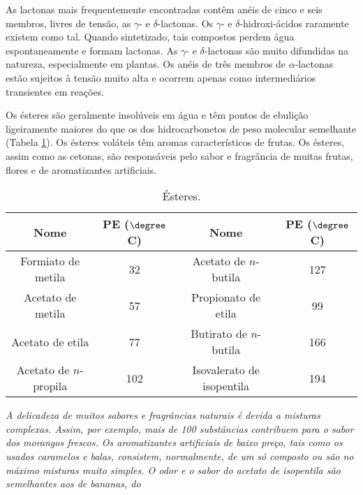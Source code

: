 \noindent As lactonas mais frequentemente encontradas contêm anéis de cinco e seis membros, livres de tensão, as $\gamma$- e $\delta$-lactonas. Os $\gamma$- e $\delta$-hidroxi-ácidos raramente existem como tal. Quando sintetizado, tais compostos perdem água espontaneamente e formam lactonas. As $\gamma$- e $\delta$-lactonas são muito difundidas na natureza, especialmente em plantas. Os anéis de três membros de $\alpha$-lactonas estão sujeitos à tensão muito alta e ocorrem apenas como intermediários transientes em reações.

\begin{tightcenter}
    \chemnameinit{}
    \qquad\qquad
    \qquad\qquad
\end{tightcenter}

Os ésteres são geralmente insolúveis em água e têm pontos de ebulição ligeiramente maiores do que os dos hidrocarbonetos de peso molecular semelhante (Tabela \ref{tab8_3}). Os ésteres voláteis têm aromas característicos de frutas. Os ésteres, assim como as cetonas, são responsáveis pelo sabor e fragrância de muitas frutas, flores e de aromatizantes artificiais.

\begin{table}[H]
    \centering
    \caption{Ésteres.}
    \label{tab8_3}
    \begin{tabular}{cccc}
        \toprule
        Nome & PE ($\degree$C) & Nome & PE ($\degree$C)  \\
        \midrule
        Formiato de metila & 32 & Acetato de $n$-butila & 127 \\
        Acetato de metila & 57 & Propionato de etila & 99 \\
        Acetato de etila & 77 & Butirato de $n$-butila & 166 \\
        Acetato de $n$-propila & 102 & Isovalerato de isopentila & 194 \\
        \bottomrule
    \end{tabular}
\end{table}

\par\bigskip
\noindent\emph{A delicadeza de muitos sabores e fragrâncias naturais é devida a misturas complexas. Assim, por exemplo, mais de 100 substâncias contribuem para o sabor dos morangos frescos. Os aromatizantes artificiais de baixo preço, tais como os usados caramelos e balas, consistem, normalmente, de um só composto ou são no máximo misturas muito simples. O odor e o sabor do acetato de isopentila são semelhantes aos de bananas, do}

